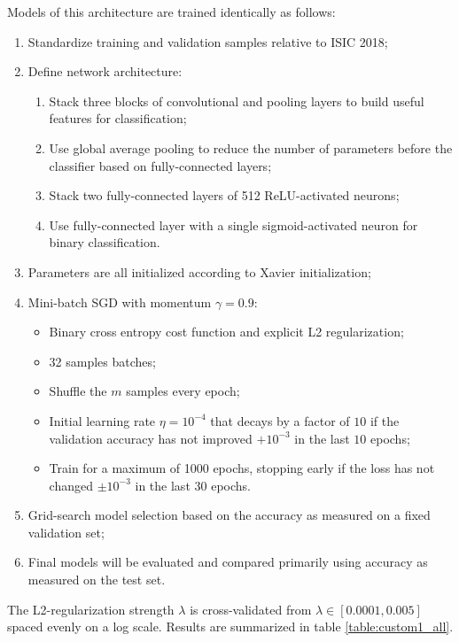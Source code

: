 Models of this architecture are trained identically as follows:

\begin{enumerate}
    \item Standardize training and validation samples relative to \ac{ISIC} 2018;
    \item Define network architecture:
        \begin{enumerate}
            \item Stack three blocks of convolutional and pooling layers to build useful features for classification;
            \item Use global average pooling to reduce the number of parameters before the classifier based on fully-connected layers;
            \item Stack two fully-connected layers of 512 ReLU-activated neurons;
            \item Use fully-connected layer with a single sigmoid-activated neuron for binary classification.
        \end{enumerate}
    \item Parameters are all initialized according to Xavier initialization;
    \item Mini-batch \ac{SGD} with momentum $\gamma = 0.9$:
        \begin{itemize}
            \item Binary cross entropy cost function and explicit L2 regularization;
            \item 32 samples batches;
            \item Shuffle the $m$ samples every epoch;
            \item Initial learning rate $\eta = 10^{-4}$ that decays by a factor of $10$ if the validation accuracy has not improved $+10^{-3}$ in the last $10$ epochs;
            \item Train for a maximum of 1000 epochs, stopping early if the loss has not changed $\pm 10^{-3}$ in the last $30$ epochs.
        \end{itemize}
    \item Grid-search model selection based on the accuracy as measured on a fixed validation set;
    \item Final models will be evaluated and compared primarily using accuracy as measured on the test set.
\end{enumerate}

The L2-regularization strength $\lambda$ is cross-validated from $\lambda \in [0.0001, 0.005]$ spaced evenly on a log scale. Results are summarized in table \ref{table:custom1_all}.

